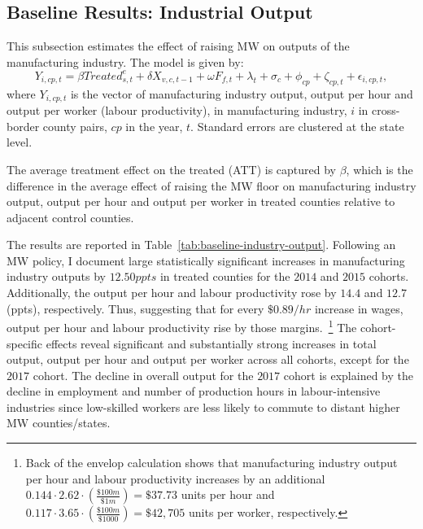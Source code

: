 \documentclass{C:/Users/david/OneDrive/Documents/ULMS/PhD/Thesis/chapter3/src/climate_change/latex/Economic_Journal/OUP-EJ}
\begin{document}
    \subsection{Baseline Results: Industrial Output}\label{subsec:baseline-results-industrial-output}
    This subsection estimates the effect of raising MW on outputs of the manufacturing industry. The model is given by:
    \begin{equation}
        Y_{i,cp,t} = \beta Treated_{s,t}^e + \delta X_{v,c,t-1} + \omega F_{f,t} + \lambda_{t} + \sigma_{c} + \phi_{cp} + \zeta_{cp,t} + \epsilon_{i,cp,t},\label{eq:baseline-output}
    \end{equation}
    where $Y_{i,cp,t}$ is the vector of manufacturing industry output, output per hour and output per worker (labour productivity), in manufacturing industry, $i$ in cross-border county pairs, $cp$ in the year, $t$. Standard errors are clustered at the state level.
    

    The average treatment effect on the treated (ATT) is captured by $\beta$, which is the difference in the average effect of raising the MW floor on manufacturing industry output, output per hour and output per worker in treated counties relative to adjacent control counties.

    The results are reported in Table~\ref{tab:baseline-industry-output}. Following an MW policy, I document large statistically significant increases in manufacturing industry outputs by $12.50ppts$ in treated counties for the $2014$ and $2015$ cohorts. Additionally, the output per hour and labour productivity rose by $14.4$ and $12.7$ (ppts), respectively. Thus, suggesting that for every $\$0.89/hr$ increase in wages, output per hour and labour productivity rise by those margins.~\footnote{\tiny Back of the envelop calculation shows that manufacturing industry output per hour and labour productivity increases by an additional $0.144 \cdot 2.62 \cdot \left(\frac{\$100m}{\$1m}\right) = \$37.73$ units per hour and $0.117 \cdot 3.65 \cdot \left(\frac{\$100m}{\$1000}\right) = \$42,705$ units per worker, respectively.} The cohort-specific effects reveal significant and substantially strong increases in total output, output per hour and output per worker across all cohorts, except for the $2017$ cohort. The decline in overall output for the $2017$ cohort is explained by the decline in employment and number of production hours in labour-intensive industries since low-skilled workers are less likely to commute to distant higher MW counties/states.
\end{document}
